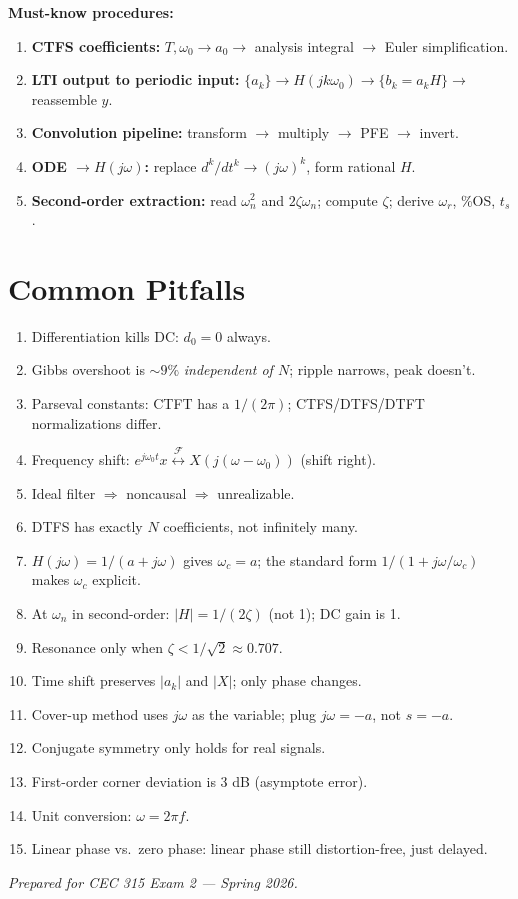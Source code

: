 \documentclass[11pt]{article}
\newcommand{\FT}{\overset{\mathcal{F}}{\longleftrightarrow}}
\begin{document}
\textbf{Must-know procedures:}
\begin{enumerate}[leftmargin=*]
  \item \textbf{CTFS coefficients:} $T,\omega_0 \to a_0 \to$ analysis integral $\to$ Euler simplification.
  \item \textbf{LTI output to periodic input:} $\{a_k\} \to H(jk\omega_0) \to \{b_k=a_k H\} \to$ reassemble $y$.
  \item \textbf{Convolution pipeline:} transform $\to$ multiply $\to$ PFE $\to$ invert.
  \item \textbf{ODE $\to H(j\omega)$:} replace $d^k/dt^k \to (j\omega)^k$, form rational $H$.
  \item \textbf{Second-order extraction:} read $\omega_n^2$ and $2\zeta\omega_n$; compute $\zeta$; derive $\omega_r$, \%OS, $t_s$.
\end{enumerate}

\section{Common Pitfalls}
\begin{enumerate}[leftmargin=*]
  \item Differentiation kills DC: $d_0 = 0$ always.
  \item Gibbs overshoot is $\sim 9\%$ \emph{independent of $N$}; ripple narrows, peak doesn't.
  \item Parseval constants: CTFT has a $1/(2\pi)$; CTFS/DTFS/DTFT normalizations differ.
  \item Frequency shift: $e^{j\omega_0 t}x \FT X(j(\omega-\omega_0))$ (shift right).
  \item Ideal filter $\Rightarrow$ noncausal $\Rightarrow$ unrealizable.
  \item DTFS has exactly $N$ coefficients, not infinitely many.
  \item $H(j\omega) = 1/(a+j\omega)$ gives $\omega_c = a$; the standard form $1/(1+j\omega/\omega_c)$ makes $\omega_c$ explicit.
  \item At $\omega_n$ in second-order: $|H|=1/(2\zeta)$ (not 1); DC gain is 1.
  \item Resonance only when $\zeta < 1/\sqrt{2} \approx 0.707$.
  \item Time shift preserves $|a_k|$ and $|X|$; only phase changes.
  \item Cover-up method uses $j\omega$ as the variable; plug $j\omega=-a$, not $s=-a$.
  \item Conjugate symmetry only holds for real signals.
  \item First-order corner deviation is 3 dB (asymptote error).
  \item Unit conversion: $\omega = 2\pi f$.
  \item Linear phase vs.\ zero phase: linear phase still distortion-free, just delayed.
\end{enumerate}

\vfill
\begin{center}
\textit{Prepared for CEC 315 Exam 2 --- Spring 2026.}
\end{center}
\end{document}
